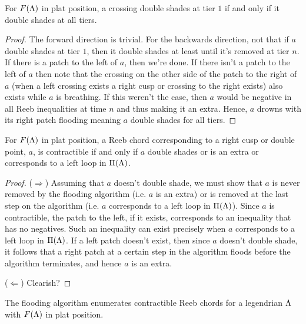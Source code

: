 \documentclass[11pt,oneside]{amsart}
\begin{document}
\begin{lemma}
    \label{lem:doubleshadecrit}
        For $F(\Lambda)$ in plat position, a crossing double shades at tier $1$ if and only if it double shades at all tiers.
\end{lemma}
\begin{proof}
    The forward direction is trivial. For the backwards direction, not that if $a$ double shades at tier $1$, then it double shades at least until it's removed at tier $n$. If there is a patch to the left of $a$, then we're done. If there isn't a patch to the left of $a$ then note that the crossing on the other side of the patch to the right of $a$ (when a left crossing exists a right cusp or crossing to the right exists) also exists while $a$ is breathing. If this weren't the case, then $a$ would be negative in all Reeb inequalities at time $n$ and thus making it an extra. Hence, $a$ drowns with its right patch flooding meaning $a$ double shades for all tiers.
\end{proof}

\begin{proposition}
    \label{prop:contractdesc}
    For $F(\Lambda)$ in plat position, a Reeb chord corresponding to a right cusp or double point, $a$, is contractible if and only if $a$ double shades or is an extra or corresponds to a left loop in $\Pi(\Lambda)$.
\end{proposition}

\begin{proof}
    ($\Rightarrow$) Assuming that $a$ doesn't double shade, we must show that $a$ is never removed by the flooding algorithm (i.e. $a$ is an extra) or is removed at the last step on the algorithm (i.e. $a$ corresponds to a left loop in $\Pi(\Lambda)$). Since $a$ is contractible, the patch to the left, if it exists, corresponds to an inequality that has no negatives. Such an inequality can exist precisely when $a$ corresponds to a left loop in $\Pi(\Lambda)$. If a left patch doesn't exist, then since $a$ doesn't double shade, it follows that a right patch at a certain step in the algorithm floods before the algorithm terminates, and hence $a$ is an extra.

    ($\Leftarrow$) Clearish?
\end{proof}

\begin{corollary}
    \label{cor:contractenum}
    The flooding algorithm enumerates contractible Reeb chords for a legendrian $\Lambda$ with $F(\Lambda)$ in plat position.
\end{corollary}
\end{document}

